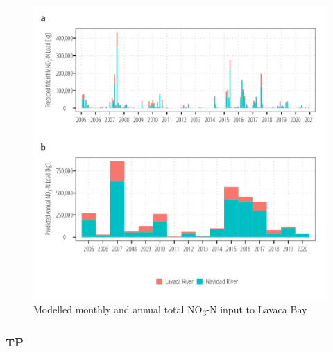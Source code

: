 \documentclass[
]{article}
\begin{document}
\begin{figure}[h]

{\centering \includegraphics{load_estimates_files/figure-pdf/no3_total_export-1.png}

}

\caption{Modelled monthly and annual total NO\textsubscript{3}-N input
to Lavaca Bay}

\end{figure}

\clearpage

\hypertarget{tp}{%
\subsubsection{TP}\label{tp}}
\end{document}
